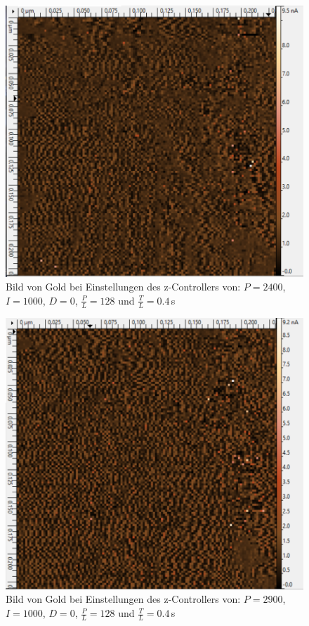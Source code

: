 \begin{figure}[ht]
	\includegraphics[scale=0.5]{Bild/Para/P1}
	\centering
	\caption[Parameter Änderung 1]{Bild von Gold bei Einstellungen des z-Controllers von: $P=2400$, $I=1000$, $D=0$, $\frac{P}{L}=128$ und $\frac{T}{L}=0.4\,$s}
\end{figure}
\begin{figure}[ht]
	\includegraphics[scale=0.5]{Bild/Para/P2}
	\centering
	\caption[Parameter Änderung 2]{Bild von Gold bei Einstellungen des z-Controllers von: $P=2900$, $I=1000$, $D=0$, $\frac{P}{L}=128$ und $\frac{T}{L}=0.4\,$s}
\end{figure}
